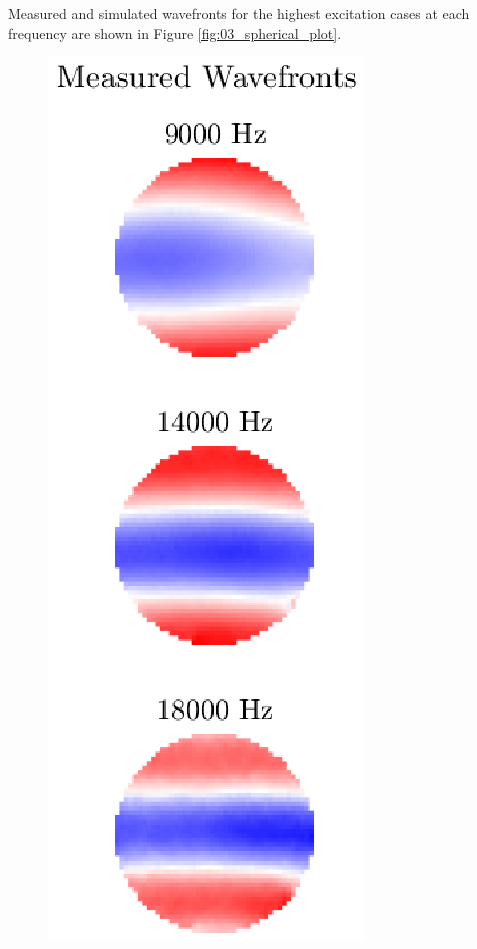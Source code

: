 Measured and simulated wavefronts for the highest excitation cases at each frequency are shown in Figure \ref{fig:03_spherical_plot}.
\begin{figure}
  \centering
  \includegraphics{../matlab/03_aero_optics_acoustics/spherical_plot_measured.eps}

\end{figure}
